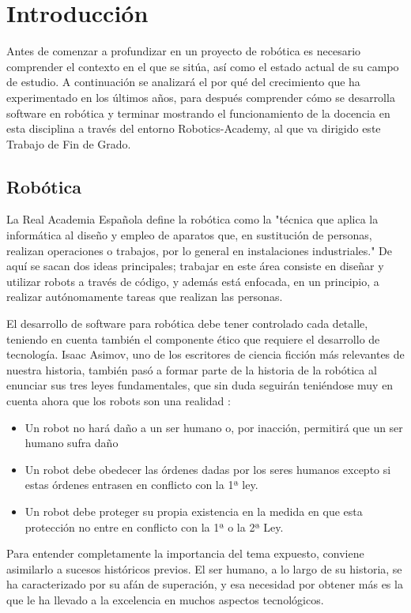 \documentclass[12pt,spanish,chapterprefix, numbers=noenddot]{book}
\numberwithin{equation}{section}
\numberwithin{figure}{section}
\begin{document}
\tableofcontents{}

\mainmatter

\chapter{Introducción}
Antes de comenzar a profundizar en un proyecto de robótica es necesario comprender el contexto en el que se sitúa, así como el estado actual de su campo de estudio. A continuación se analizará el por qué del crecimiento que ha experimentado en los últimos años, para después comprender cómo se desarrolla software en robótica y terminar mostrando el funcionamiento de la docencia en esta disciplina a través del entorno Robotics-Academy, al que va dirigido este Trabajo de Fin de Grado. 

\section{Robótica}
La Real Academia Española define la robótica como la "técnica que aplica la informática al diseño y empleo de aparatos que, en sustitución de personas, realizan operaciones o trabajos, por lo general en instalaciones industriales." De aquí se sacan dos ideas principales; trabajar en este área consiste en diseñar y utilizar robots a través de código, y además está enfocada, en un principio, a realizar autónomamente tareas que realizan las personas.

El desarrollo de software para robótica debe tener controlado cada detalle, teniendo en cuenta también el componente ético que requiere el desarrollo de tecnología. Isaac Asimov, uno de los escritores de ciencia ficción más relevantes de nuestra historia, también pasó a formar parte de la historia de la robótica al enunciar sus tres leyes fundamentales, que sin duda seguirán teniéndose muy en cuenta ahora que los robots son una realidad :
\begin{itemize}
    \item Un robot no hará daño a un ser humano o, por inacción, permitirá que un ser humano sufra daño
    \item Un robot debe obedecer las órdenes dadas por los seres humanos excepto si estas órdenes entrasen en conflicto con la 1ª ley.
    \item Un robot debe proteger su propia existencia en la medida en que esta protección no entre en conflicto con la 1ª o la 2ª Ley.
\end{itemize}

Para entender completamente la importancia del tema expuesto, conviene asimilarlo a sucesos históricos previos. El ser humano, a lo largo de su historia, se ha caracterizado por su afán de superación, y esa necesidad por obtener más es la que le ha llevado a la excelencia en muchos aspectos tecnológicos. 
\end{document}
